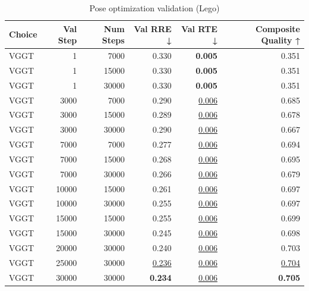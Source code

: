 \begin{table}[H]
\caption{Pose optimization validation (Lego)}
\label{tab:04_pose_opt_validation_lego}
\begin{tabular}{lrrrrr}
\toprule
Choice & Val Step & Num Steps & Val RRE ↓ & Val RTE ↓ & Composite Quality ↑ \\
\midrule
VGGT & 1 & 7000 & 0.330 & \textbf{0.005} & 0.351 \\
VGGT & 1 & 15000 & 0.330 & \textbf{0.005} & 0.351 \\
VGGT & 1 & 30000 & 0.330 & \textbf{0.005} & 0.351 \\
VGGT & 3000 & 7000 & 0.290 & \underline{0.006} & 0.685 \\
VGGT & 3000 & 15000 & 0.289 & \underline{0.006} & 0.678 \\
VGGT & 3000 & 30000 & 0.290 & \underline{0.006} & 0.667 \\
VGGT & 7000 & 7000 & 0.277 & \underline{0.006} & 0.694 \\
VGGT & 7000 & 15000 & 0.268 & \underline{0.006} & 0.695 \\
VGGT & 7000 & 30000 & 0.266 & \underline{0.006} & 0.679 \\
VGGT & 10000 & 15000 & 0.261 & \underline{0.006} & 0.697 \\
VGGT & 10000 & 30000 & 0.255 & \underline{0.006} & 0.697 \\
VGGT & 15000 & 15000 & 0.255 & \underline{0.006} & 0.699 \\
VGGT & 15000 & 30000 & 0.245 & \underline{0.006} & 0.698 \\
VGGT & 20000 & 30000 & 0.240 & \underline{0.006} & 0.703 \\
VGGT & 25000 & 30000 & \underline{0.236} & \underline{0.006} & \underline{0.704} \\
VGGT & 30000 & 30000 & \textbf{0.234} & \underline{0.006} & \textbf{0.705} \\
\bottomrule
\end{tabular}
\end{table}
